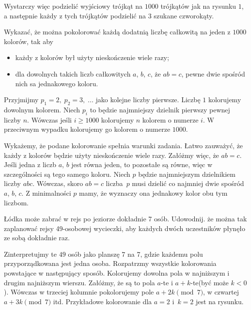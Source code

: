 \noindent
Wystarczy więc podzielić wyjściowy trójkąt na $1000$ trójkątów jak na rysunku $1$, a następnie każdy z tych trójkątów podzielić na $3$ szukane czworokąty.

\vspace{10px}

\begin{problem}{4} 
	Wykazać, że można pokolorować każdą dodatnią liczbę całkowitą na jeden z $1000$ kolorów, tak aby
	\begin{itemize}
		\item każdy z kolorów był użyty nieskończenie wiele razy;
		\item dla dowolnych takich liczb całkowitych $a$, $b$, $c$, że $ab = c$, pewne dwie spośród nich sa jednakowego koloru.
	\end{itemize} 
\end{problem}

\vspace{5px}

\noindent
Przyjmijmy $p_1 = 2,\; p_2 = 3, \; ...$ jako kolejne liczby pierwsze. Liczbę $1$ kolorujemy dowolnym kolorem. Niech $p_i$ to będzie najmniejszy dzielnik pierwszy pewnej liczby $n$. Wówczas jeśli $i \geqslant 1000$ kolorujemy $n$ kolorem o numerze $i$. W przeciwnym wypadku kolorujemy go kolorem o numerze $1000$.

\vspace{5px}

\noindent
Wykażemy, że podane kolorowanie spełnia warunki zadania. Łatwo zauważyć, że każdy z kolorów będzie użyty nieskończenie wiele razy. Załóżmy więc, że $ab = c$. Jeśli jedna z liczb $a$, $b$ jest równa jeden, to pozostałe są równe, więc w szczególności są tego samego koloru. Niech $p$ będzie najmniejszym dzielnikiem liczby $abc$. Wówczas, skoro $ab = c$ liczba~$p$ musi dzielić co najmniej dwie spośród $a$, $b$, $c$. Z minimalności $p$ mamy, że wyznaczy ona jednakowy kolor obu tym liczbom.

\vspace{10px}

\begin{problem}{5}
	Łódka może zabrać w rejs po jeziorze dokładnie 7 osób. Udowodnij. że można tak zaplanować rejsy 49-osobowej wycieczki, aby każdych dwóch uczestników płynęło ze sobą dokładnie raz.
\end{problem}

\noindent
Zinterpretujmy te $49$ osób jako planszę 7 na 7, gdzie każdemu polu przyporządkowana jest jedna osoba. Rozpatrzmy wszystkie kolorowania powstające w następujący sposób. Kolorujemy dowolna pola w najniższym i drugim najniższym wierszu. Załóżmy, że są to pola $a$-te i $a + k$-te(być może $k < 0$). Wówczas w trzeciej kolumnie pokolorujemy pole $a + 2k \pmod{7}$, w czwartej $a + 3k \pmod{7}$ itd. Przykładowe kolorowanie dla $a = 2$ i~$k = 2$ jest na rysunku.


